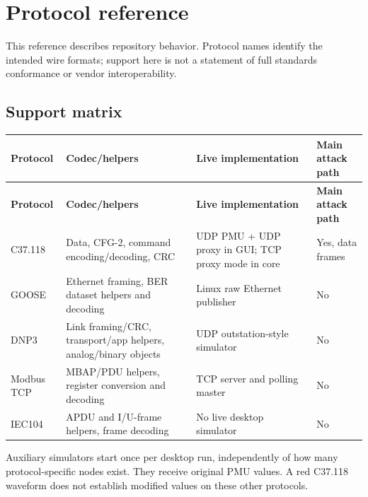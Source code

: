 \chapter{Protocol reference}\label{chapter-7}
This reference describes repository behavior. Protocol names identify the intended wire formats; support here is not a statement of full standards conformance or vendor interoperability.

\section*{Support matrix}
\begingroup
\fontsize{8.7}{11.8}\selectfont
\setlength{\tabcolsep}{5pt}
\renewcommand{\arraystretch}{1.23}
\begin{longtable}{@{}>{\raggedright\arraybackslash}p{}>{\raggedright\arraybackslash}p{}>{\raggedright\arraybackslash}p{}>{\raggedright\arraybackslash}p{}@{}}
\rowcolor{navy} \color{white}\bfseries Protocol & \color{white}\bfseries Codec/helpers & \color{white}\bfseries Live implementation & \color{white}\bfseries Main attack path \\
\endfirsthead
\rowcolor{navy} \color{white}\bfseries Protocol & \color{white}\bfseries Codec/helpers & \color{white}\bfseries Live implementation & \color{white}\bfseries Main attack path \\
\endhead
\endfoot
\rowcolor{pale}
C37.118 & Data, CFG-2, command encoding/decoding, CRC & UDP PMU + UDP proxy in GUI; TCP proxy mode in core & Yes, data frames \\
GOOSE & Ethernet framing, BER dataset helpers and decoding & Linux raw Ethernet publisher & No \\
\rowcolor{pale}
DNP3 & Link framing/CRC, transport/app helpers, analog/binary objects & UDP outstation-style simulator & No \\
Modbus TCP & MBAP/PDU helpers, register conversion and decoding & TCP server and polling master & No \\
\rowcolor{pale}
IEC104 & APDU and I/U-frame helpers, frame decoding & No live desktop simulator & No \\
\end{longtable}
\endgroup

Auxiliary simulators start once per desktop run, independently of how many protocol-specific nodes exist. They receive original PMU values. A red C37.118 waveform does not establish modified values on these other protocols.

